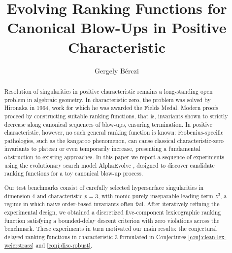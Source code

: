 \documentclass[11pt]{amsart}
\title{Evolving Ranking Functions for Canonical Blow-Ups 
in Positive Characteristic}
\author{Gergely B\'erczi}
\begin{document}
\begin{abstract}
Resolution of singularities in positive characteristic remains a long-standing open problem in algebraic geometry. In characteristic zero, the problem was solved by Hironaka in 1964, work for which he was awarded the Fields Medal. Modern proofs proceed by constructing suitable ranking functions, that is,  invariants shown to strictly decrease along canonical sequences of blow-ups, ensuring termination. In positive characteristic, however, no such general ranking function is known: Frobenius-specific pathologies, such as the kangaroo phenomenon, can cause classical characteristic-zero invariants to plateau or even temporarily increase, presenting a fundamental obstruction to existing approaches.
In this paper we report a sequence of experiments using the evolutionary search model AlphaEvolve
\cite{NovikovEtAl2025AlphaEvolve}, designed to discover candidate ranking functions for a toy canonical blow-up process.

Our test benchmarks consist of carefully selected hypersurface singularities in dimension $4$ and characteristic
$p=3$, with monic purely inseparable leading term $z^3$, a regime in which naive order-based invariants often fail. After iteratively refining the experimental design, we obtained
a discretized five-component lexicographic ranking function satisfying a bounded-delay descent criterion with zero violations across the benchmark. These experiments in turn motivated our main results: the conjectural delayed ranking functions in characteristic $3$ formulated in Conjectures \ref{conj:clean-lex-weierstrass} and \ref{conj:disc-robust}.

\end{abstract}
\maketitle
\end{document}
